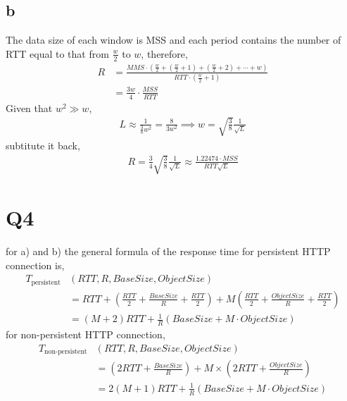 \documentclass[a4paper, 11pt]{article}
\begin{document}
\subsection{b}
The data size of each window is MSS and each period contains the number of RTT
equal to that from $\frac{w}{2}$ to $w$, therefore,
\begin{align}
	R &= \frac{ MMS \cdot
		\left( \frac{w}{2} + \left(\frac{w}{2} + 1 \right) 
			+ \left(\frac{w}{2} + 2\right) + \cdots + w 
		\right)
	}{RTT \cdot
		\left( \frac{w}{2} + 1 \right)
		} \\
		&= \frac{3 w}{4} \cdot \frac{MSS}{RTT}
\end{align}
Given that $w^2 \gg w$, 
\begin{align}
	L \approx \frac{1}{\frac{3}{8} w^2} = \frac{8}{3 w^2} 
	\implies w = \sqrt{\frac{3}{8}} \frac{1}{\sqrt{L}}
\end{align}
subtitute it back, 
\begin{align}
	R = \frac{3}{4} \sqrt{\frac{3}{8}} \frac{1}{\sqrt{L}}
		\approx \frac{1.22474 \cdot MSS} {RTT \sqrt{L}}
\end{align}

\section{Q4}
for a) and b) the general formula of the response time for persistent HTTP
connection is, 
\begin{align}
	T_{\text{persistent}}&(RTT, R, BaseSize, ObjectSize) \\
	&= RTT + \left(
				\frac{RTT}{2}
				+ \frac{BaseSize}{R}
				+ \frac{RTT}{2}
			\right) + 
			M \left( 
				\frac{RTT}{2} + 
					\frac{ObjectSize}{R} +
				\frac{RTT}{2} 
			\right) \\
		&= 
			(M + 2) RTT + \frac{1}{R}\left(BaseSize + M \cdot ObjectSize \right)
\end{align}
for non-persistent HTTP connection, 
\begin{align}
	T_{\text{non-persistent}}&(RTT, R, BaseSize, ObjectSize) \\
		&= \left( 2RTT + \frac{BaseSize}{R}\right)
			+ M \times \left( 2RTT + \frac{ObjectSize}{R}\right) \\
		&= 2(M + 1)RTT + \frac{1}{R}\left(BaseSize + M \cdot ObjectSize \right)
\end{align}
\end{document}
